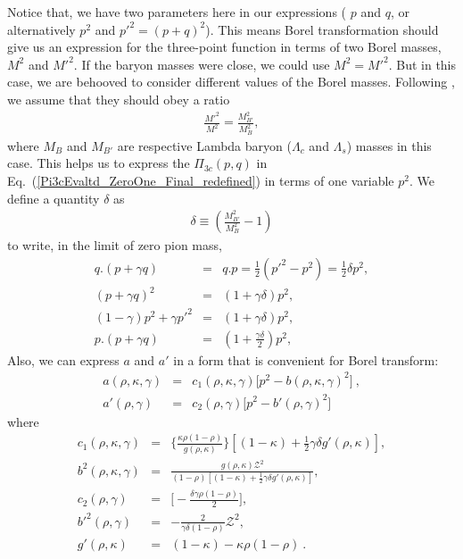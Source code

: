 \documentclass[twoside]{article}
\begin{document}
\noindent
Notice that, we have two parameters here in our expressions ( $p$ and $q$, or 
alternatively $p^2$ and ${p'}^2 = (p+q)^2$). This means Borel transformation 
should give us an expression for the three-point function in terms of two Borel
masses, $M^2$ and ${M'}^2$. If the baryon masses were close, we could use $M^2 
= {M'}^2$. But in this case, we are behooved to consider different values of 
the Borel masses. Following \cite{Nielson2000}, we assume that they should obey
a ratio
\begin{eqnarray}
\label{BorelRatio}
\frac{{M'}^2}{{M}^2} = \frac{M_{B'}^2}{M_{B}^2},
\end{eqnarray}
where $M_B$ and $M_{B'}$ are respective Lambda baryon ($\Lambda_c$ and 
$\Lambda_s$) masses in this case. This helps us to express the $\Pi_{3c}(p,q)$ 
in Eq.~(\ref{Pi3cEvaltd_ZeroOne_Final_redefined}) in terms of one variable 
$p^2$. We define a quantity $\delta$ as
\begin{eqnarray}
\label{def_delta}
\delta \equiv \left( \frac{M_{B'}^2}{M_B^2} - 1 \right)
\end{eqnarray}
to write, in the limit of zero pion mass,
\begin{eqnarray}
\label{exp1}
q.(p+\gamma q) &=& q.p = \frac{1}{2}(p'^2 - p^2) = \frac{1}{2} \delta p^2, \\
\label{exp2}
(p + \gamma q)^2 &=& (1 + \gamma \delta)p^2, \\
\label{exp3}
(1 - \gamma)p^2 + \gamma {p'}^2 &=& (1 + \gamma \delta)p^2, \\
\label{exp4}
p.(p+ \gamma q) &=& (1 + \frac{\gamma \delta}{2})p^2,
\label{exp5}
\end{eqnarray} 
Also, we can express $a$ and $a'$ in a form that is convenient for Borel 
transform:
\begin{eqnarray}
a(\rho, \kappa, \gamma)
&=&
c_1(\rho, \kappa, \gamma)
\Big[
p^2 - b(\rho, \kappa, \gamma)^2
\Big] ~,\\
a'(\rho, \gamma)
&=&
c_2(\rho, \gamma)
\Big[
p^2 - {b'(\rho, \gamma)}^2
\Big]
\end{eqnarray}
where
\begin{eqnarray}
c_1(\rho, \kappa, \gamma)
&=&
\Big\{
\frac{\kappa \rho (1 - \rho)}{g(\rho, \kappa)}
\Big\}
\left[
(1 - \kappa) + \frac{1}{2} \gamma \delta g'(\rho, \kappa)
\right],\\
b^2(\rho, \kappa, \gamma)
&=&
\frac{g(\rho, \kappa){\mathcal{Z}}^2 }{(1 - \rho) \left[ (1 - \kappa) + 
\frac{1}{2} \gamma \delta g'(\rho, \kappa) \right]}, \\
c_2(\rho, \gamma) &=& \Big[- \frac{\delta \gamma \rho (1 - \rho)}{2} \Big], \\
{{b'}^2(\rho, \gamma)}
&=& -\frac{2}{\gamma \delta (1 - \rho)} {\mathcal{Z}}^2, \\
g'(\rho, \kappa) &=& (1 - \kappa) - \kappa \rho (1 - \rho)~.
\end{eqnarray}
\end{document}
